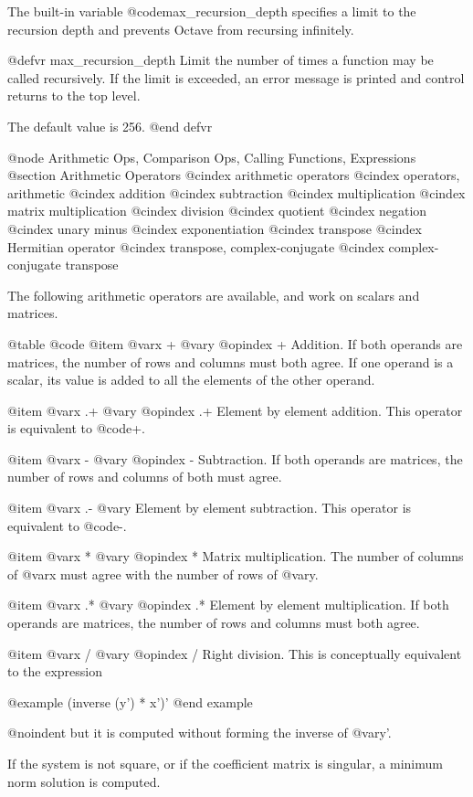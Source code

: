 The built-in variable @code{max_recursion_depth} specifies a limit to
the recursion depth and prevents Octave from recursing infinitely.

@defvr max_recursion_depth
Limit the number of times a function may be called recursively.
If the limit is exceeded, an error message is printed and control
returns to the top level.

The default value is 256.
@end defvr

@node Arithmetic Ops, Comparison Ops, Calling Functions, Expressions
@section Arithmetic Operators
@cindex arithmetic operators
@cindex operators, arithmetic
@cindex addition
@cindex subtraction
@cindex multiplication
@cindex matrix multiplication
@cindex division
@cindex quotient
@cindex negation
@cindex unary minus
@cindex exponentiation
@cindex transpose
@cindex Hermitian operator
@cindex transpose, complex-conjugate
@cindex complex-conjugate transpose

The following arithmetic operators are available, and work on scalars
and matrices.

@table @code
@item @var{x} + @var{y}
@opindex +
Addition.  If both operands are matrices, the number of rows and columns
must both agree.  If one operand is a scalar, its value is added to
all the elements of the other operand.

@item @var{x} .+ @var{y}
@opindex .+
Element by element addition.  This operator is equivalent to @code{+}.

@item @var{x} - @var{y}
@opindex -
Subtraction.  If both operands are matrices, the number of rows and
columns of both must agree.

@item @var{x} .- @var{y}
Element by element subtraction.  This operator is equivalent to @code{-}.

@item @var{x} * @var{y}
@opindex *
Matrix multiplication.  The number of columns of @var{x} must agree
with the number of rows of @var{y}.

@item @var{x} .* @var{y}
@opindex .*
Element by element multiplication.  If both operands are matrices, the
number of rows and columns must both agree.

@item @var{x} / @var{y}
@opindex /
Right division.  This is conceptually equivalent to the expression

@example
(inverse (y') * x')'
@end example

@noindent
but it is computed without forming the inverse of @var{y'}.

If the system is not square, or if the coefficient matrix is singular,
a minimum norm solution is computed.

